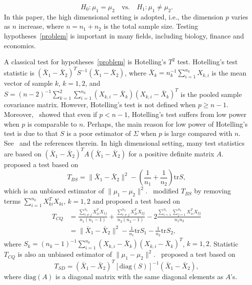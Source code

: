 \documentclass[review]{elsarticle}
\theoremstyle{plain}
\theoremstyle{definition}
\theoremstyle{remark}
\begin{document}
\begin{equation}\label{problem}
    H_0:\mu_1=\mu_2\quad \textrm{vs.}\quad H_1:\mu_1\neq \mu_2.
\end{equation}
 In this paper, {the} high dimensional setting is adopted, i.e., the dimension $p$ varies as $n$ increase, where $n=n_1+n_2$ is the total sample size.
Testing hypotheses~\eqref{problem} is important in many fields, including biology, finance and economics.


A classical test for hypotheses~\eqref{problem} is Hotelling's $T^2$ test.
Hotelling's test statistic is ${(\bar{X}_1-\bar{X}_2)}^T S^{-1}(\bar{X}_1-\bar{X}_2)$, where $\bar{X}_k=n_k^{-1}\sum_{i=1}^{n_k}X_{k,i}$ is the mean vector of sample $k$, $k=1,2$, and
    $
    S=
{(n-2)}^{-1}\sum_{k=1}^2\sum_{i=1}^{n_k} (X_{k,i}-\bar{X}_k) {(X_{k,i}-\bar{X}_k)}^T
    $
is the pooled sample covariance matrix.
However, Hotelling's test is not defined when $p\geq n-1$.
Moreover,~\cite{Bai1996Efiect} showed that even if $p<n-1$, Hotelling's test suffers from low power when $p$ is comparable to $n$.
Perhaps, the main reason for low power of Hotelling's test is due to that $S$ is a poor estimator of $\Sigma$ when $p$ is large compared with $n$. See~\cite{Chen2010A} and the references therein.
In high dimensional setting,  
many test statistics are based on ${(\bar{X}_1-\bar{X}_2)}^T A(\bar{X}_1-\bar{X}_2)$ for a positive definite matrix $A$.~\cite{Bai1996Efiect} proposed a test based on
\begin{equation*}
    T_{BS}=\|\bar{X}_1-\bar{X}_2\|^2-(\frac{1}{n_1}+\frac{1}{n_2})\mathrm{tr}S,
\end{equation*}
which is an unbiased estimator of $\|\mu_1-\mu_2\|^2$.~\cite{Chen2010A} modified $T_{BS}$ by removing terms $\sum_{i=1}^{n_k}X_{ki}^T X_{ki}$, $k=1,2$ and proposed a test based on
\begin{equation*}
    \begin{aligned}
        T_{CQ}&=\frac{\sum_{i\neq j}^{n_1}X_{1i}^T X_{1j}}{n_1(n_1-1)}+\frac{\sum_{i\neq j}^{n_2}X_{2i}^T X_{2j}}{n_2(n_2-1)}-2\frac{\sum_{i=1}^{n_1}\sum_{j=1}^{n_2}X_{1i}^T X_{2j}}{n_1n_2}
        \\
            &=\|\bar{X}_1-\bar{X}_2\|^2-\frac{1}{n_1}\mathrm{tr}S_1-\frac{1}{n_2}\mathrm{tr}S_2,
    \end{aligned}
\end{equation*}
where
$S_k={(n_k -1)}^{-1}\sum_{i=1}^{n_k} (X_{k,i}-\bar{X}_k) {(X_{k,i}-\bar{X}_k)}^T
$, $k=1,2$.
 Statistic $T_{CQ}$ 
is also an unbiased estimator of $\|\mu_1-\mu_2\|^2$.~\cite{Srivastava2008A} proposed a test based on
\begin{equation*}
    T_{SD}={(\bar{X}_1-\bar{X}_2)}^T {[\mathrm{diag}(S)]}^{-1}(\bar{X}_1-\bar{X}_2),
\end{equation*}
where $\textrm{diag} (A)$ is a diagonal matrix with the same diagonal elements as $A$'s.
\end{document}
